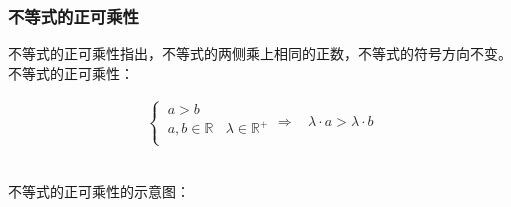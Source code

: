 \documentclass[UTF8]{ctexart}
\begin{document}
\newpage

\subsubsection{不等式的正可乘性}
    \setcounter{equation}{0}
    不等式的正可乘性指出，不等式的两侧乘上相同的正数，不等式的符号方向不变。\\[3mm]
    不等式的正可乘性：
    \begin{large}
        \begin{align*}
            \begin{cases}
                ~a>b\\[3mm]
                ~a,b\in\mathbb{R}~~~~\lambda\in\mathbb{R^+}\\
            \end{cases}
            \Longrightarrow~~~~\lambda\cdot a>\lambda\cdot b
        \end{align*}
    \end{large}\\[3mm]
    不等式的正可乘性的示意图：
\end{document}
